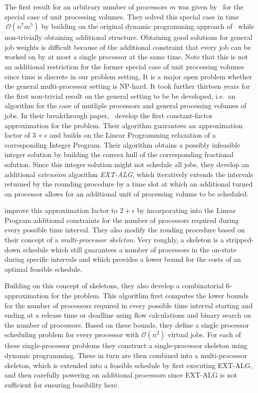 \documentclass[a4paper]{article}
\begin{document}
The first result for an arbitrary number of processors $m$ was given by~\cite{demaine} for the special case of unit processing volumes.
They solved this special case in time $~\mathcal{O}(n^7m^5)$ by building on the original dynamic programming approach of~\cite{baptiste_unit_jobs} while non-trivially obtaining additional structure.
Obtaining good solutions for general job weights is difficult because of the additional constraint that every job can be worked on by at most a single processor at the same time.
Note that this is not an additional restriction for the former special case of unit processing volumes since time is discrete in our problem setting.
It is a major open problem whether the general multi-processor setting is NP-hard.
It took further thirteen years for the first non-trivial result on the general setting to be be developed, i.e.\ an algorithm for the case of mutliple processors and general processing volumes of jobs.
In their breakthrough paper,~\cite{antoniadis} develop the first constant-factor approximation for the problem.
Their algorithm guarantees an approximation factor of $3 + \epsilon$ and builds on the Linear Programming relaxation of a corresponding Integer Program.
Their algorithm obtains a possibly infeasible integer solution by building the convex hull of the corresponding fractional solution.
Since this integer solution might not schedule all jobs, they develop an additional \textit{extension} algorithm \textit{EXT-ALG}, which iteratively extends the intervals returned by the rounding procedure by a time slot at which an additional turned on processor allows for an additional unit of processing volume to be scheduled.

\cite{skeletons} improve this approximation factor to $2 + \epsilon$ by incorporating into the Linear Program additional constraints for the number of processors required during every possible time interval.
They also modify the rouding procedure based on their concept of a \textit{multi-processor skeleton}.
Very roughly, a skeleton is a stripped-down schedule which still guarantees a number of processors in the on-state during specific intervals and which provides a lower bound for the costs of an optimal feasible schedule.

Building on this concept of skeletons, they also develop a combinatorial $6$-approximation for the problem.
This algorithm first computes the lower bounds for the number of processors required in every possible time interval starting and ending at a release time or deadline using flow calculations and binary search on the number of processors.
Based on these bounds, they define a single processor scheduling problem for every processor with $\mathcal{O}(n^2)$ virtual jobs.
For each of these single-processor problems they construct a single-processor skeleton using dynamic programming.
These in turn are then combined into a multi-processor skeleton, which is extended into a feasible schedule by first executing EXT-ALG, and then carefully powering on additional processors since EXT-ALG is not sufficient for ensuring feasibility here.
\end{document}
